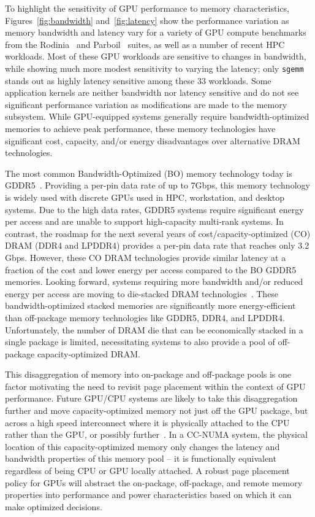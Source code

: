 To highlight the sensitivity of GPU performance to memory characteristics,
Figures~\ref{fig:bandwidth} and~\ref{fig:latency} show the performance variation
as memory bandwidth and latency vary for a variety of GPU compute benchmarks
from the Rodinia~\cite{Che2009} and {\color{black}Parboil~\cite{Parboil} suites,
as well as a number of recent HPC~\cite{comd,cns,minife,xsbench} workloads. Most
of these GPU workloads are sensitive to changes in bandwidth, while showing much
more modest sensitivity to varying the latency; only {\tt sgemm} stands out as
highly latency sensitive among these 33 workloads. Some application kernels are
neither bandwidth nor latency sensitive and do not see significant performance
variation as modifications are made to the memory subsystem.} While GPU-equipped
systems generally require bandwidth-optimized memories to achieve peak
performance, these memory technologies have significant cost, capacity, and/or
energy disadvantages over alternative DRAM technologies.

The most common Bandwidth-Optimized (BO) memory technology today is
GDDR5~\cite{GDDR5}.  Providing a per-pin data rate of up to 7Gbps, this memory
technology is widely used with discrete GPUs used in HPC, workstation, and
desktop systems.  Due to the high data rates, GDDR5 systems require significant
energy per access and are unable to support high-capacity multi-rank systems.
In contrast, the roadmap for the next several years of cost/capacity-optimized
(CO) DRAM (DDR4 and LPDDR4) provides a per-pin data rate that reaches only 3.2
Gbps.  However, these CO DRAM technologies provide similar latency at a fraction
of the cost and lower energy per access compared to the BO GDDR5 memories.
Looking forward, systems requiring more bandwidth and/or reduced energy per
access are moving to  die-stacked DRAM technologies~\cite{HBM,WIDEIO2}.  These
bandwidth-optimized stacked memories are significantly more energy-efficient
than off-package memory technologies like GDDR5, DDR4, and LPDDR4.
Unfortunately, the number of DRAM die that can be economically stacked in a
single package is limited, necessitating systems to also provide a pool of
off-package capacity-optimized DRAM.

This disaggregation of memory into on-package and off-package pools is one
factor motivating the need to revisit page placement within the context of GPU
performance.  Future GPU/CPU systems are likely to take this disaggregation
further and move capacity-optimized memory not just off the GPU package, but
across a high speed interconnect where it is physically attached to the CPU
rather than the GPU, or possibly further~\cite{limchang09}.  In a CC-NUMA
system, the physical location of this capacity-optimized memory only changes the
latency and bandwidth properties of this memory pool -- it is functionally
equivalent regardless of being CPU or GPU locally attached.  A robust page
placement policy for GPUs will abstract the on-package, off-package, and remote
memory properties into performance and power characteristics based on which it
can make optimized decisions.

